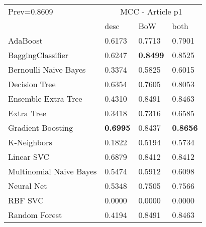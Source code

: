 \begin{tabular}{|l|l|l|l| }
\hline
Prev=0.8609 &  \multicolumn{3}{c|}{MCC - Article p1} \\
\cline{2-4} & desc & BoW & both \\ \hline
AdaBoost                & 0.6173 & 0.7713 & 0.7901\\
BaggingClassifier       & 0.6247 & {\bf 0.8499} & 0.8525\\
Bernoulli Naive Bayes   & 0.3374 & 0.5825 & 0.6015\\
Decision Tree           & 0.6354 & 0.7605 & 0.8053\\
Ensemble Extra Tree     & 0.4310 & 0.8491 & 0.8463\\
Extra Tree              & 0.3418 & 0.7316 & 0.6585\\
Gradient Boosting       & {\bf 0.6995} & 0.8437 & {\bf 0.8656}\\
K-Neighbors             & 0.1822 & 0.5194 & 0.5734\\
Linear SVC              & 0.6879 & 0.8412 & 0.8412\\
Multinomial Naive Bayes & 0.5474 & 0.5912 & 0.6098\\
Neural Net              & 0.5348 & 0.7505 & 0.7566\\
RBF SVC                 & 0.0000 & 0.0000 & 0.0000\\
Random Forest           & 0.4194 & 0.8491 & 0.8463\\
\hline
\end{tabular}